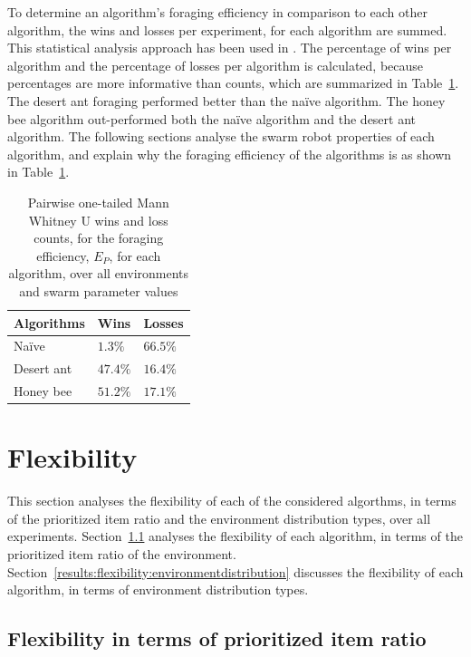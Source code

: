 To determine an algorithm's foraging efficiency in comparison to each other algorithm, the wins and losses per experiment, for each algorithm are summed. This statistical analysis approach has been used in \cite{helbig2013performance}. The percentage of wins per algorithm and the percentage of losses per algorithm is calculated, because percentages are more informative than counts, which are summarized in Table~\ref{summarytable}. The desert ant foraging performed better than the na\"ive algorithm. The honey bee algorithm out-performed both the na\"ive algorithm and the desert ant algorithm. The following sections analyse the swarm robot properties of each algorithm, and explain why the foraging efficiency of the algorithms is as shown in Table~\ref{summarytable}.

\begin{table}[]
\centering
\caption{Pairwise one-tailed Mann Whitney U wins and loss counts, for the foraging efficiency, $E_P$, for each algorithm, over all environments and swarm parameter values }
\label{summarytable}
\begin{tabular}{@{}lll@{}}
\toprule
\textbf{Algorithms} & \textbf{Wins} & \textbf{Losses} \\ \midrule
Na\"ive               & $1.3\%$          & $66.5\%$           \\
Desert ant          & $47.4\%$         & $16.4\%$           \\
Honey bee           & $51.2\%$         & $17.1\%$          \\ \bottomrule
\end{tabular}
\end{table}

\section{Flexibility}
\label{results:flexibility}

This section analyses the flexibility of each of the considered algorthms, in terms of the prioritized item ratio and the environment distribution types, over all experiments. Section~\ref{results:prioritizeditemratio} analyses the flexibility of each algorithm, in terms of the prioritized item ratio of the environment. Section~\ref{results:flexibility:environmentdistribution} discusses the flexibility of each algorithm, in terms of environment distribution types.
\subsection{Flexibility in terms of prioritized item ratio}
\label{results:prioritizeditemratio}

